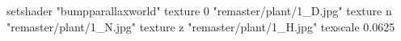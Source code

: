 setshader "bumpparallaxworld"
    texture 0 "remaster/plant/1_D.jpg"
    texture n "remaster/plant/1_N.jpg"
    texture z "remaster/plant/1_H.jpg"
    texscale 0.0625